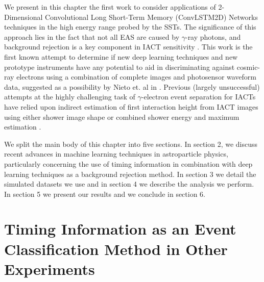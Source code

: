 We present in this chapter the first work to consider applications of 2-Dimensional Convolutional Long Short-Term Memory (ConvLSTM2D) Networks techniques in the high energy range probed by the SSTs. The significance of this approach lies in the fact that not all EAS are caused by $\gamma$-ray photons, and background rejection is a key component in IACT sensitivity \cite{Shilon}. This work is the first known attempt to determine if new deep learning techniques and new prototype instruments have any potential to aid in discriminating against cosmic-ray electrons using a combination of complete images and photosensor waveform data, suggested as a possibility by Nieto et. al in \cite{nieto2017exploring}. Previous (largely unsuccessful) attempts at the highly challenging task of $\gamma$-electron event separation for IACTs have relied upon indirect estimation of first interaction height from IACT images using either shower image shape or combined shower energy and maximum estimation \cite{Sitarek1i}.

We split the main body of this chapter into five sections. In section 2, we discuss recent advances in machine learning techniques in astroparticle physics, particularly concerning the use of timing information in combination with deep learning techniques as a background rejection method. In section 3 we detail the simulated datasets we use and in section 4 we describe the analysis we perform. In section 5 we present our results and we conclude in section 6. 

\section{Timing Information as an Event Classification Method in Other Experiments} \label{RelatedWork}

